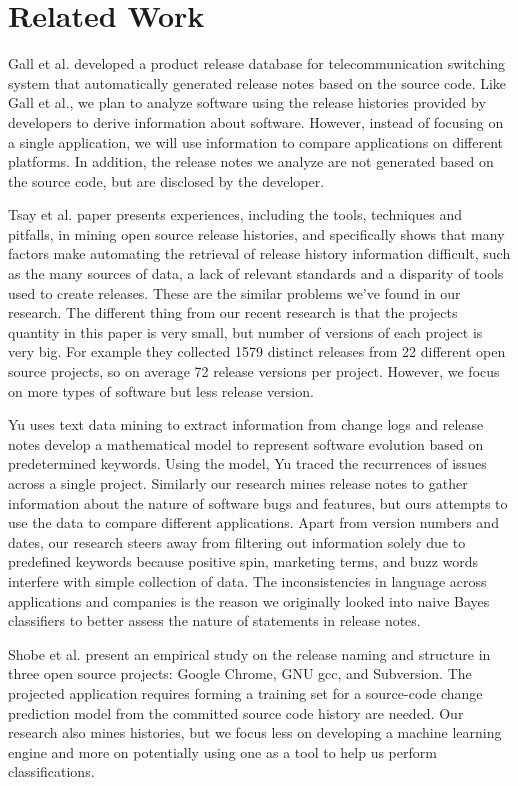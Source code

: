 \documentclass{acm_proc_article-sp}
\begin{document}
\section{Related Work}

Gall et al. \cite{GallSoftwareEv} developed a product release database for telecommunication switching system that automatically generated release notes based on the source code.
Like Gall et al., we plan to analyze software using the release histories provided by developers to derive information about software. 
However, instead of focusing on a single application, we will use information to compare applications on different platforms. 
In addition, the release notes we analyze are not generated based on the source code, but are disclosed by the developer.

Tsay et al. \cite{TsayOpenSourceMining} paper presents experiences, including the tools, techniques and pitfalls, in mining open source release histories, and specifically shows that many factors make automating the retrieval of release history information difficult, such as the many sources of data, a lack of relevant standards and a disparity of tools used to create releases. These are the similar problems we've found in our research.
The different thing from our recent research is that the projects quantity in this paper is very small, but number of versions of each project is very big. For example they collected 1579 distinct releases from 22 different open source projects, so on average 72 release versions per project. However, we focus on more types of software but less release version.

Yu \cite{YuChangeLogs} uses text data mining to extract information from change logs and release notes develop a mathematical model to represent software evolution based on predetermined keywords. Using the model, Yu traced the recurrences of issues across a single project.
Similarly our research mines release notes to gather information about the nature of software bugs and features, but ours attempts to use the data to compare different applications. 
Apart from version numbers and dates, our research steers away from filtering out information solely due to predefined keywords because positive spin, marketing terms, and buzz words interfere with simple collection of data. 
The inconsistencies in language across applications and companies is the reason we originally looked into naive Bayes classifiers to better assess the nature of statements in release notes.

Shobe et al. \cite{ShobeMapping} present an empirical study on the release naming and structure in three open source projects: Google Chrome, GNU gcc, and Subversion.  
The projected application requires forming a training set for a source-code change prediction model from the committed source code history are needed.
Our research also mines histories, but we focus less on developing a machine learning engine and more on potentially using one as a tool to help us perform classifications.
\end{document}
